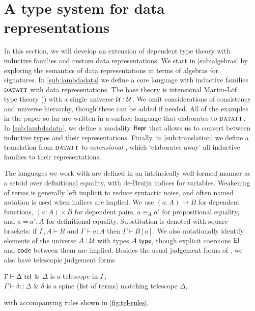 \section{A type system for data representations}\label{sec:type-system}

In this section, we will develop an extension of dependent type theory with
inductive families and custom data representations. We start in
\cref{sub:algebras} by exploring the semantics of data representations in terms
of algebras for signatures. In \cref{sub:lambdadata} we define a core language
with inductive families ${\textsc{datatt}}$ with data representations. The base theory
is intensional Martin-L\"of type theory (\lambdamltt) \cite{Martin-Lof1984-pz}
with a single universe $\mathcal{U} : \mathcal{U}$. We omit considerations of consistency
and universe hierarchy, though these can be added if needed. All of the examples
in the paper so far are written in a surface language that elaborates to
${\textsc{datatt}}$. In \cref{sub:lambdadata}, we define a modality $\textsf{Repr}$ that
allows us to convert between inductive types and their representations. Finally,
in \cref{sub:translation} we define a translation from ${\textsc{datatt}}$ to
\emph{extensional} \lambdamltt, which `elaborates away' all inductive families
to their representations.

The languages we work with are defined in an intrinsically well-formed manner
as a setoid over definitional equality, with de-Bruijn
indices for variables. Weakening of terms is generally left implicit to reduce
syntactic noise, and often named notation is used when indices are
implied. We use $(a : A) \to B$ for dependent functions, $(a : A) \times B$ for
dependent pairs, $a \equiv_A a'$ for propositional equality, and $a = a' : A$
for definitional equality. Substitution is denoted with square brackets: if
$\Gamma, A \vdash B$ and $\Gamma \vdash a : A$ then $\Gamma \vdash B[a]$. We
also notationally identify elements of the universe $A : \mathcal{U}$ with types $A
\ \textsf{type}$, though explicit coercions $\textsf{El}$ and $\textsf{code}$ between them are
implied.
Besides the
usual judgement forms of \lambdamltt, we also have telescopic judgement forms
\begin{definitions}
$\Gamma \vdash \Delta \ \textsf{tel}$                & $\Delta$ is a telescope in $\Gamma$, \\
$\Gamma \vdash \delta :: \Delta$           & $\delta$ is a spine (list of terms) matching telescope $\Delta$,
\end{definitions}
with accompanying rules shown in \cref{fig:tel-rules}.

